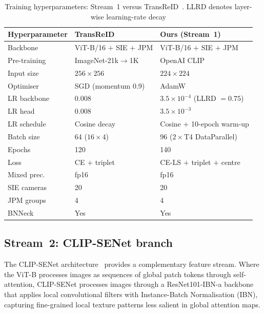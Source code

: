 \documentclass[10pt,a4paper]{article}
\begin{document}
\begin{table}[!t]
  \centering
  \caption{Training hyperparameters: Stream~1 versus
  TransReID~\cite{he2021transreid}. LLRD denotes layer-wise learning-rate
  decay}
  \label{tab:hyperparams}
  \small
  \begin{tabular}{L{4.0cm}L{4.4cm}L{4.6cm}}
    \toprule
    Hyperparameter & TransReID~\cite{he2021transreid} & Ours (Stream~1) \\
    \midrule
    Backbone     & ViT-B/16 $+$ SIE $+$ JPM       & ViT-B/16 $+$ SIE $+$ JPM \\
    Pre-training & ImageNet-21k$\!\to\!$1K        & OpenAI CLIP~\cite{radford2021clip} \\
    Input size   & $256\times256$                 & $224\times224$ \\
    Optimiser    & SGD (momentum 0.9)             & AdamW~\cite{loshchilov2019adamw} \\
    LR backbone  & 0.008                          & $3.5\times10^{-4}$ (LLRD $=0.75$) \\
    LR head      & 0.008                          & $3.5\times10^{-3}$ \\
    LR schedule  & Cosine decay                   & Cosine $+$ 10-epoch warm-up \\
    Batch size   & 64 ($16\times4$)               & 96 ($2\times$T4 DataParallel) \\
    Epochs       & 120                            & 140 \\
    Loss         & CE $+$ triplet                 & CE-LS $+$ triplet $+$ centre \\
    Mixed prec.  & fp16                           & fp16 \\
    SIE cameras  & 20                             & 20 \\
    JPM groups   & 4                              & 4 \\
    BNNeck       & Yes                            & Yes \\
    \bottomrule
  \end{tabular}
\end{table}

\subsection{Stream~2: CLIP-SENet branch}
The CLIP-SENet architecture~\cite{lu2025clipsenet} provides a complementary
feature stream. Where the ViT-B processes images as sequences of global patch
tokens through self-attention, CLIP-SENet processes images through a
ResNet101-IBN-a backbone~\cite{pan2018ibn} that applies local convolutional
filters with Instance-Batch Normalisation (IBN), capturing fine-grained local
texture patterns less salient in global attention maps.
\end{document}
